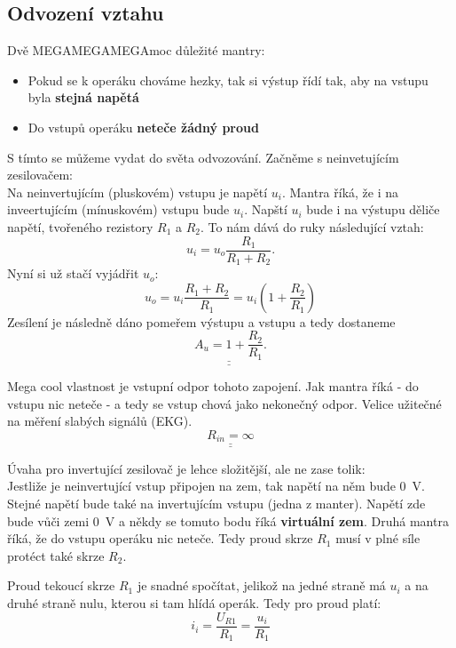 \documentclass[a4paper,12pt]{article}   %
\begin{document}
\subsection*{Odvození vztahu}
Dvě MEGAMEGAMEGAmoc důležité mantry:
\begin{itemize}
    \item Pokud se k operáku chováme hezky, tak si výstup řídí tak, aby na vstupu byla \textbf{stejná napětá}
    \item Do vstupů operáku \textbf{neteče žádný proud}
\end{itemize}

S tímto se můžeme vydat do světa odvozování. Začněme s neinvetujícím zesilovačem:\\
Na neinvertujícím (pluskovém) vstupu je napětí $u_i$. Mantra říká, že i na inveertujícím (mínuskovém) vstupu bude $u_i$. Napští $u_i$ bude i na výstupu děliče napětí, tvořeného rezistory $R_1$ a $R_2$. To nám dává do ruky následující vztah:
\begin{equation*}
    u_i = u_o \frac{R_1}{R_1 + R_2}.
\end{equation*}
Nyní si už stačí vyjádřit $u_o$:
\begin{equation*}
    u_o = u_i \frac{R_1 + R_2}{R_1} = u_i (1+\frac{R_2}{R_1})
\end{equation*}
Zesílení je následně dáno pomeřem výstupu a vstupu a tedy dostaneme
\begin{equation*}
    \underline{\underline{A_u = 1+\frac{R_2}{R_1}}}.
\end{equation*}

Mega cool vlastnost je vstupní odpor tohoto zapojení. Jak mantra říká - do vstupu nic neteče - a tedy se vstup chová jako nekonečný odpor. Velice užitečné na měření slabých signálů (EKG).
\begin{equation*}
    \underline{\underline{R_{in} = \infty}}
\end{equation*}

Úvaha pro invertující zesilovač je lehce složitější, ale ne zase tolik:\\
Jestliže je neinvertující vstup připojen na zem, tak napětí na něm bude $0$~V. Stejné napětí bude také na invertujícím vstupu (jedna z manter). Napětí zde bude vůči zemi 0~V a někdy se tomuto bodu říká \textbf{virtuální zem}. Druhá mantra říká, že do vstupu operáku nic neteče. Tedy proud skrze $R_1$ musí v plné síle protéct také skrze $R_2$.

Proud tekoucí skrze $R_1$ je snadné spočítat, jelikož na jedné straně má $u_i$ a na druhé straně nulu, kterou si tam hlídá operák. Tedy pro proud platí:
\begin{equation*}
    i_i = \frac{U_{R1}}{R_1} = \frac{u_i}{R_1}
\end{equation*}
\end{document}
